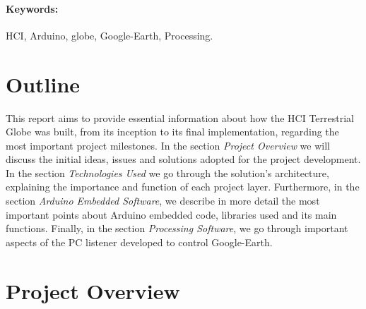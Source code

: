 \documentclass[12pt]{article}
\begin{document}
\maketitle

\paragraph{Keywords:}
HCI, Arduino, globe, Google-Earth, Processing.

\section{Outline}

This report aims to provide essential information about how the HCI Terrestrial Globe was built, from its inception to its final implementation, regarding the most important project milestones. In the section \textit{Project Overview} we will discuss the initial ideas, issues and solutions adopted for the project development. In the section \textit{Technologies Used} we go through the solution's architecture, explaining the importance and function of each project layer. Furthermore, in the section \textit{Arduino Embedded Software}, we describe in more detail the most important points about Arduino embedded code, libraries used and its main functions. Finally, in the section \textit{Processing Software}, we go through important aspects of the PC listener developed to control Google-Earth.

\section{Project Overview}
\end{document}
